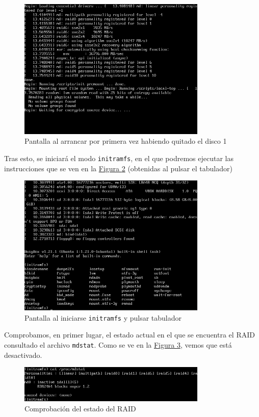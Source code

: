 \documentclass[10pt,a4paper,spanish]{article}
\numberwithin{equation}{section} %
\numberwithin{figure}{section} %
\numberwithin{table}{section} %
\begin{document}
\begin{figure}[!h]
\centering
\includegraphics[width=0.8\textwidth]{7}
\caption{Pantalla al arrancar por primera vez habiendo quitado el disco 1}
\label{raid1}
\end{figure}

Tras esto, se iniciará el modo \texttt{initramfs}, en el que podremos ejecutar las instrucciones que se ven en la \hyperref[initramfs]{Figura \ref*{initramfs}} (obtenidas al pulsar el tabulador)

\begin{figure}[!h]
\centering
\includegraphics[width=0.8\textwidth]{8}
\caption{Pantalla al iniciarse \texttt{initramfs} y pulsar tabulador}
\label{initramfs}
\end{figure}

Comprobamos, en primer lugar, el estado actual en el que se encuentra el RAID consultado el archivo \texttt{mdstat}. Como se ve en la \hyperref[inactive]{Figura \ref*{inactive}}, vemos que está desactivado.

\begin{figure}[!h]
\centering
\includegraphics[width=0.8\textwidth]{10}
\caption{Comprobación del estado del RAID}
\label{inactive}
\end{figure}
\end{document}
